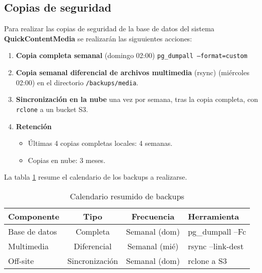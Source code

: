 \subsection{Copias de seguridad}

Para realizar las copias de seguridad de la base de datos del sistema \textbf{QuickContentMedia} se realizarán las siguuientes acciones:

\begin{enumerate}
  \item \textbf{Copia completa semanal} (domingo 02:00)  
        \texttt{pg\_dumpall --format=custom}  
  \item \textbf{Copia semanal diferencial de archivos multimedia} (rsync)  
        (miércoles 02:00) en el directorio \texttt{/backups/media}.
  \item \textbf{Sincronización en la nube} una vez por semana, tras la
        copia completa, con \texttt{rclone} a un bucket S3.  
  \item \textbf{Retención}  
        \begin{itemize}
          \item Últimas 4 copias completas locales: 4 semanas.  
          \item Copias en nube: 3 meses.  
        \end{itemize}
\end{enumerate}
La tabla \ref{tab:bkp_small} resume el calendario de los backups a realizarse.
\begin{table}[htbp]
\centering
\caption{Calendario resumido de backups}\label{tab:bkp_small}
\begin{tabular}{|l|c|c|l|}
\hline
\textbf{Componente} & \textbf{Tipo} & \textbf{Frecuencia} & \textbf{Herramienta} \\ \hline
Base de datos & Completa & Semanal (dom) & pg\_dumpall –Fc \\ \hline
Multimedia    & Diferencial & Semanal (mié) & rsync --link-dest \\ \hline
Off-site      & Sincronización & Semanal (dom) & rclone a S3 \\ \hline
\end{tabular}
\end{table}
